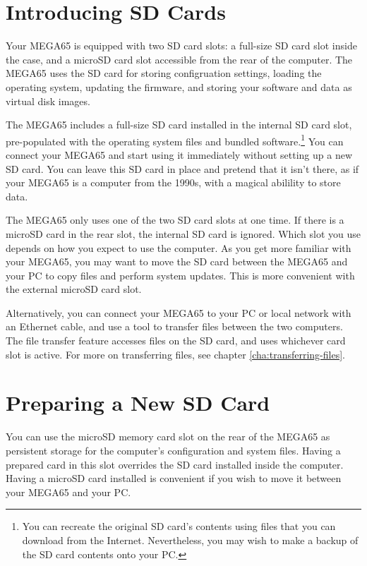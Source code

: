 \section{Introducing SD Cards}
\label{sec:introducing-sd-cards}

Your MEGA65 is equipped with two SD card slots: a full-size SD card slot inside the case, and a microSD card slot accessible from the rear of the computer. The MEGA65 uses the SD card for storing configruation settings, loading the operating system, updating the firmware, and storing your software and data as virtual disk images.

The MEGA65 includes a full-size SD card installed in the internal SD card slot, pre-populated with the operating system files and bundled software.\footnote{You can recreate the original SD card's contents using files that you can download from the Internet. Nevertheless, you may wish to make a backup of the SD card contents onto your PC.} You can connect your MEGA65 and start using it immediately without setting up a new SD card. You can leave this SD card in place and pretend that it isn't there, as if your MEGA65 is a computer from the 1990s, with a magical abilility to store data.

The MEGA65 only uses one of the two SD card slots at one time. If there is a microSD card in the rear slot, the internal SD card is ignored. Which slot you use depends on how you expect to use the computer. As you get more familiar with your MEGA65, you may want to move the SD card between the MEGA65 and your PC to copy files and perform system updates. This is more convenient with the external microSD card slot.

Alternatively, you can connect your MEGA65 to your PC or local network with an Ethernet cable, and use a tool to transfer files between the two computers. The file transfer feature accesses files on the SD card, and uses whichever card slot is active. For more on transferring files, see chapter \vref{cha:transferring-files}.

\section{Preparing a New SD Card}

You can use the microSD memory card slot on the rear of the MEGA65 as persistent storage for the computer's configuration and system files. Having a prepared card in this slot overrides the SD card installed inside the computer. Having a microSD card installed is convenient if you wish to move it between your MEGA65 and your PC.

